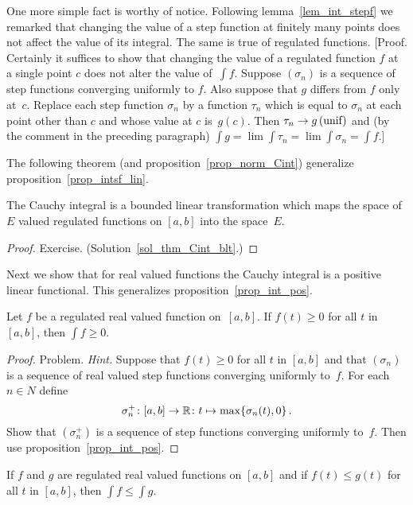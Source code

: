 One more simple fact is worthy of notice.  Following lemma~\ref{lem_int_stepf} we remarked
that changing the value of a step function at finitely many points does not affect the value
of its integral.  The same is true of regulated functions. [Proof. Certainly it suffices to
show that changing the value of a regulated function $f$ at a single point $c$ does not alter
the value of~$\int f$.  Suppose $(\sigma_n)$ is a sequence of step functions converging
uniformly to $f$.  Also suppose that $g$ differs from $f$ only at~$c$.  Replace each step
function $\sigma_n$ by a function $\tau_n$ which is equal to $\sigma_n$ at each point other
than $c$ and whose value at $c$ is~$g(c)$.  Then $\tau_n \rightarrow g \text{\,(unif)}$ and (by the
comment in the preceding paragraph) $\int g = \lim \int \tau_n = \lim \int \sigma_n = \int
f.$]

The following theorem (and proposition~\ref{prop_norm_Cint}) generalize
proposition~\ref{prop_intsf_lin}.

\begin{thm}\label{thm_Cint_blt}  The Cauchy integral is a bounded linear transformation which
maps the space of $E$ valued regulated functions on $[a,b]$ into the space~$E$.
\end{thm}

\begin{proof} Exercise. (Solution~\ref{sol_thm_Cint_blt}.)  \ns   \end{proof}

Next we show that for real valued functions the Cauchy integral is a positive linear
functional.  This generalizes proposition~\ref{prop_int_pos}.

\begin{prop}  Let $f$ be a regulated real valued function on~$[a,b]$.  If $f(t) \ge 0$ for all
$t$ in $[a,b]$, then $\int f \ge 0$.
\end{prop}

\begin{proof} Problem.  \emph{Hint.} Suppose that $f(t) \ge 0$ for all $t$ in $[a,b]$ and that
$(\sigma_n)$ is a sequence of real valued step functions converging uniformly to~$f$.  For
each $n \in N$ define
  \[ \sigma_n^+\colon [a,b] \rightarrow \mathbb{R}\colon t \mapsto \max\{\sigma_n(t),0\}\,. \]
Show that $(\sigma_n^+)$ is a sequence of step functions converging uniformly to~$f$.  Then
use proposition~\ref{prop_int_pos}.  \ns
\end{proof}

\begin{cor}  If $f$ and $g$ are regulated real valued functions on $[a,b]$ and if $f(t) \le g(t)$
for all $t$ in $[a,b]$, then $\int f \le \int g$.
\end{cor}

